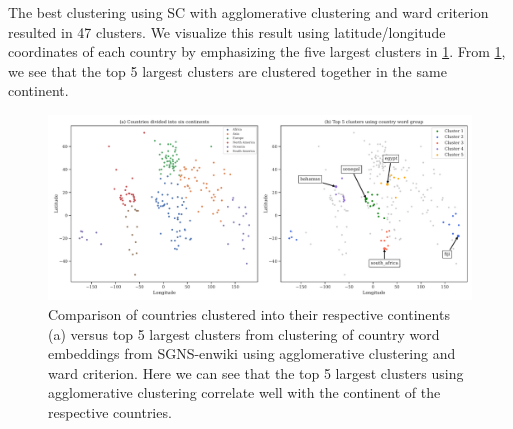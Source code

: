 The best clustering using SC with agglomerative clustering and ward criterion resulted in 47 clusters. We visualize this result using latitude/longitude coordinates of each country by emphasizing the five largest clusters in \cref{fig:cluster-analysis-agglomerative-country-word-group-top-clusters}. From \cref{fig:cluster-analysis-agglomerative-country-word-group-top-clusters}, we see that the top 5 largest clusters are clustered together in the same continent.
\begin{figure}[H]
    \centering
    \includegraphics[width=\textwidth]{thesis/figures/cluster-analysis-agglomerative-country-word-group-top-clusters.pdf}
    \caption{Comparison of countries clustered into their respective continents (a) versus top 5 largest clusters from clustering of country word embeddings from SGNS-enwiki using agglomerative clustering and ward criterion. Here we can see that the top 5 largest clusters using agglomerative clustering correlate well with the continent of the respective countries.}
    \label{fig:cluster-analysis-agglomerative-country-word-group-top-clusters}
\end{figure}

